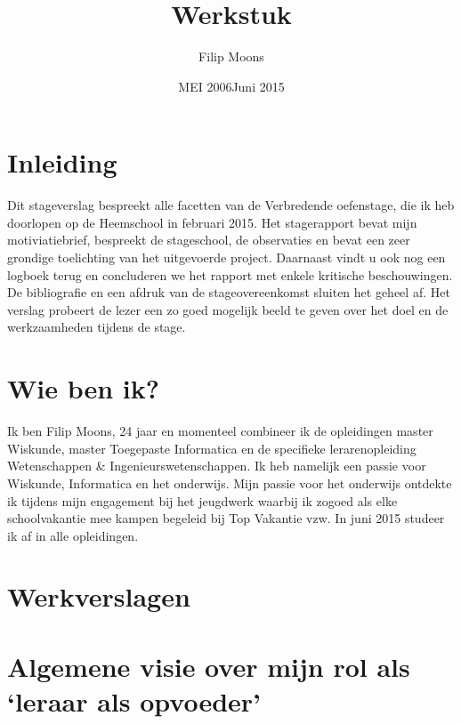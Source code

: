 \documentclass[a4paper,11pt]{article}
\author{Filip Moons}
\title{Werkstuk}
\date{MEI 2006}
\date{Juni 2015}
\theoremstyle{definition}
\begin{document}
\maketitlepage


\tableofcontents
\newpage
\section{Inleiding}
Dit stageverslag bespreekt alle facetten van de Verbredende oefenstage, die ik heb doorlopen op de Heemschool in februari 2015. 
Het stagerapport bevat mijn motiviatiebrief, bespreekt de stageschool, de observaties en bevat een zeer grondige toelichting van het uitgevoerde project. 
Daarnaast vindt u ook nog een logboek terug en concluderen we het rapport met enkele kritische beschouwingen. De bibliografie en een afdruk
van de stageovereenkomst sluiten het geheel af. Het verslag 
probeert de lezer een zo goed mogelijk beeld te geven over het doel en de 
werkzaamheden tijdens de stage.
\newpage
\section{Wie ben ik?}
Ik ben Filip Moons, 24 jaar en momenteel combineer ik de opleidingen master Wiskunde, master Toegepaste Informatica
en de specifieke lerarenopleiding Wetenschappen \& Ingenieurswetenschappen. Ik heb namelijk een passie voor
Wiskunde, Informatica en het onderwijs. Mijn passie voor het onderwijs ontdekte ik tijdens mijn engagement bij het jeugdwerk waarbij ik zogoed als
elke schoolvakantie mee  kampen begeleid bij Top Vakantie vzw. In juni 2015 studeer ik af in alle opleidingen. 

\section{Werkverslagen}

\section{Algemene visie over mijn rol als `leraar als opvoeder'}
 
\end{document}
